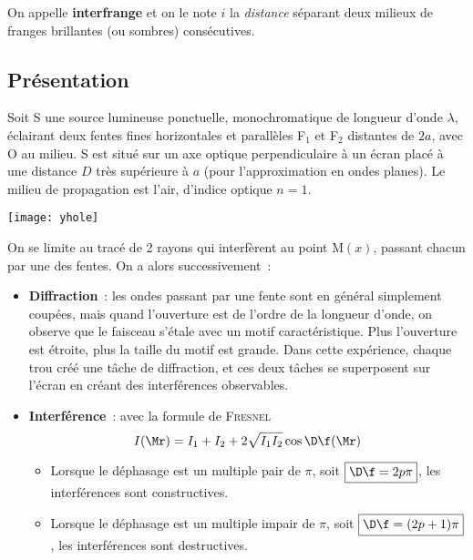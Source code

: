 \documentclass[../main/main.tex]{subfiles}
\begin{document}
\bigbreak
\begin{bror}{}
    On appelle \textbf{interfrange} et on le note $i$ la \textit{distance}
    séparant deux milieux de franges brillantes (ou sombres) consécutives.
\end{bror}

\subsection{Présentation}

Soit S une source lumineuse ponctuelle, monochromatique de longueur d'onde
$\lambda$, éclairant deux fentes fines horizontales et parallèles F$_1$ et F$_2$
distantes de $2a$, avec O au milieu. S est situé sur un axe optique
perpendiculaire à un écran placé à une distance $D$ très supérieure à $a$ (pour
l'approximation en ondes planes). Le milieu de propagation est l'air, d'indice
optique $n=1$.

\begin{center}
    \texttt{[image: yhole]}
\end{center}

On se limite au tracé de 2 rayons qui interfèrent au point M$(x)$, passant
chacun par une des fentes. On a alors successivement~:

\begin{itemize}
    \item \textbf{Diffraction}~: les ondes passant par une fente sont en général
        simplement coupées, mais quand l'ouverture est de l'ordre de la longueur
        d'onde, on observe que le faisceau s'étale avec un motif
        caractéristique. Plus l'ouverture est étroite, plus la taille du motif
        est grande. Dans cette expérience, chaque trou créé une tâche de
        diffraction, et ces deux tâches se superposent sur l'écran en créant des
        interférences observables.
    \item \textbf{Interférence}~: avec la formule de \textsc{Fresnel}
        \[I(\Mr) = I_1 + I_2 + 2\sqrt{I_1I_2}\cos\D\f(\Mr)\]
        \begin{itemize}
            \item Lorsque le déphasage est un multiple pair de $\pi$, soit
                $\boxed{\D\f = 2p\pi}$, les interférences sont constructives.
            \item Lorsque le déphasage est un multiple impair de $\pi$, soit
                $\boxed{\D\f = (2p+1)\pi}$, les interférences sont destructives.
        \end{itemize}
\end{itemize}
\end{document}
